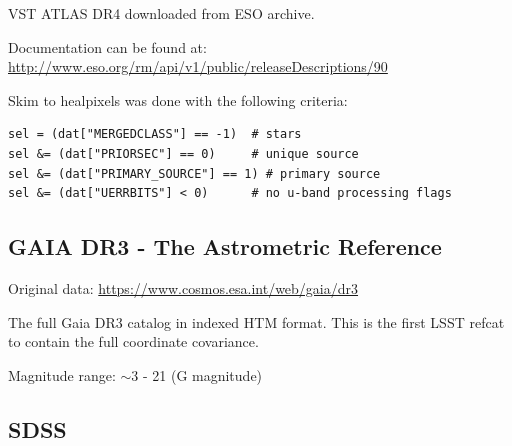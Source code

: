 VST ATLAS DR4 downloaded from ESO archive.

Documentation can be found at: \url{http://www.eso.org/rm/api/v1/public/releaseDescriptions/90}

Skim to healpixels was done with the following criteria:
\begin{verbatim}
sel = (dat["MERGEDCLASS"] == -1)  # stars
sel &= (dat["PRIORSEC"] == 0)     # unique source 
sel &= (dat["PRIMARY_SOURCE"] == 1) # primary source 
sel &= (dat["UERRBITS"] < 0)      # no u-band processing flags
\end{verbatim}

\subsection{GAIA DR3 - The Astrometric Reference}
\label{sec:gaiadr3}
Original data: \url{https://www.cosmos.esa.int/web/gaia/dr3}

The full Gaia DR3 catalog in indexed HTM format. This is the first LSST refcat to contain the full coordinate covariance.

Magnitude range: $\sim$3 - 21 (G magnitude)

\subsection{SDSS}
\label{sec:sdss}




